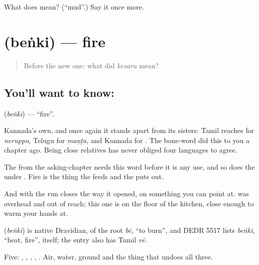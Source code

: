 \begin{tcolorbox}[breakable,colback=teal!4,colframe=teal!35!black,title={Before you move on}]
What does  mean? (\textquotedblleft{}mud\textquotedblright{}.) Say it once more.
\end{tcolorbox}
\section[\texorpdfstring{\kn{ಬೆಂಕಿ} (beṅki)}{ಬೆಂಕಿ (beṅki)}]{ (beṅki) — fire}

\label{lesson:KA-C59-fire}



\begin{quote}
Before the new one: what did \emph{kesaru} mean?
\end{quote}

\subsection*{You'll want to know: }
\textbf{} (\emph{beṅki}) — \textquotedblleft{}fire\textquotedblright{}.

Kannada's own, and once again it stands apart from its sisters: Tamil reaches for \emph{neruppu}, Telugu for \emph{maṇṭa}, and Kannada for . The bone-word did this to you a chapter ago. Being close relatives has never obliged four languages to agree.

The  from the asking-chapter needs this word before it is any use, and so does the  under . Fire is the thing the  feeds and the  puts out.

And with  the run closes the way it opened, on something you can point at.  was overhead and out of reach; this one is on the floor of the kitchen, close enough to warm your hands at.

\begin{cousinweb}
\textbf{} (\emph{beṅki}) is native Dravidian, of the root \emph{bē}, \textquotedblleft{}to burn\textquotedblright{}, and DEDR 5517 lists \emph{beṅki}, \textquotedblleft{}heat, fire\textquotedblright{}, itself; the entry also has Tamil \emph{vē}.
\end{cousinweb}

\begin{grammarlens}[title={What you've built}]
Five: , , , , . Air, water, ground and the thing that undoes all three.
\end{grammarlens}

